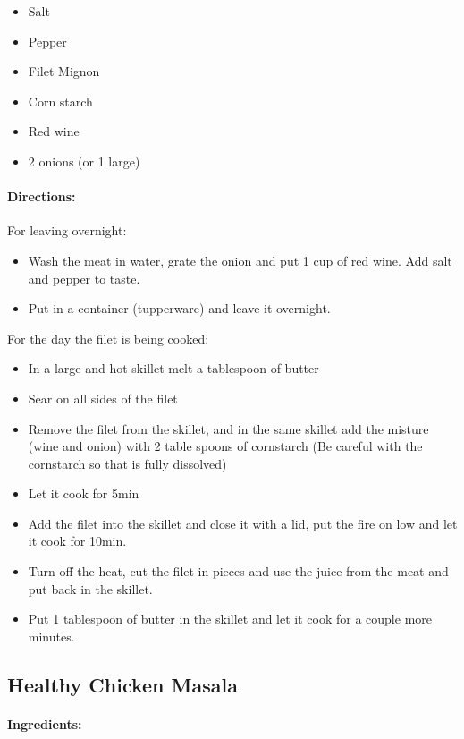 \documentclass{article}
\begin{document}
\begin{itemize}
	\item Salt
	\item Pepper
	\item Filet Mignon
	\item Corn starch
	\item Red wine
	\item 2 onions (or 1 large)
\end{itemize}

\paragraph{Directions:}

For leaving overnight:
\begin{itemize}
	\item Wash the meat in water, grate the onion and put 1 cup of red wine. Add salt and pepper to taste.
	\item Put in a container (tupperware) and leave it overnight.
\end{itemize}


For the day the filet is being cooked:
\begin{itemize}
	\item In a large and hot skillet melt a tablespoon of butter
	\item Sear on all sides of the filet
	\item Remove the filet from the skillet, and in the same skillet add the misture (wine and onion) with 2 table spoons of cornstarch (Be careful with the cornstarch so that is fully dissolved)
	\item Let it cook for 5min
	\item Add the filet into the skillet and close it with a lid, put the fire on low and let it cook for 10min.
	\item Turn off the heat, cut the filet in pieces and use the juice from the meat and put back in the skillet. 
	\item Put 1 tablespoon of butter in the skillet and let it cook for a couple more minutes.
\end{itemize}

\subsection{Healthy Chicken Masala}

\paragraph{Ingredients:}
\end{document}
